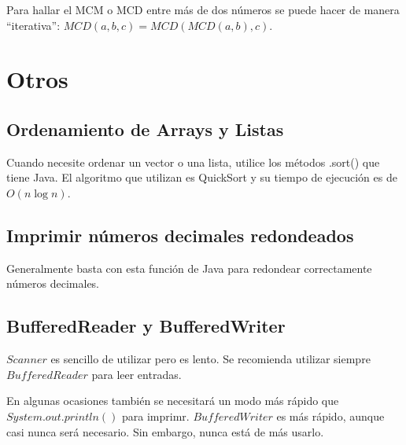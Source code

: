 \documentclass{article}
\begin{document}
\begin{multicols}{2}
Para hallar el MCM o MCD entre más de dos números se puede hacer de manera ``iterativa'': \( MCD(a, b, c) = MCD(MCD(a, b), c) \).


\section{Otros}
	\subsection{Ordenamiento de Arrays y Listas}
	Cuando necesite ordenar un vector o una lista, utilice los métodos .sort() que tiene 		Java. El algoritmo que utilizan es QuickSort y su tiempo de ejecución es de \( O(n\log n) \).	
	
	\subsection{Imprimir números decimales redondeados}
	Generalmente basta con esta función de Java para redondear correctamente números decimales.	
	
	\subsection{BufferedReader y BufferedWriter}
	\(Scanner\) es sencillo de utilizar pero es lento. Se recomienda utilizar siempre \(BufferedReader\) para leer entradas.
	
	En algunas ocasiones también se necesitará un modo más rápido que \(System.out.println()\) para imprimr. \(BufferedWriter\) es más rápido, aunque casi nunca será necesario. Sin embargo, nunca está de más usarlo.
	
\end{multicols}	
\end{document}
